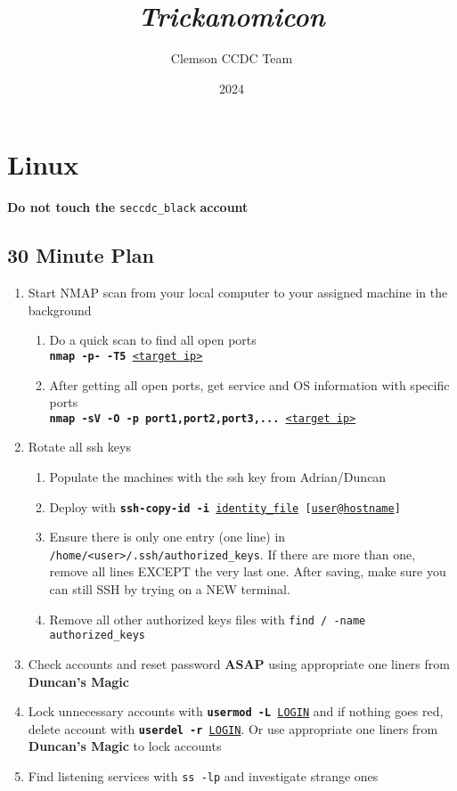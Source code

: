 \documentclass[12pt,letterpaper]{article}
\title{\huge{\textit{Trickanomicon}}}
\author{Clemson CCDC Team}
\date{2024}
\def\code#1{\textcolor{c2}{\texttt{#1}}}
\def\bf#1{\textbf{#1}}
\def\ul#1{\underline{#1}}
\begin{document}
\maketitle

\pagebreak

\tableofcontents

\pagebreak

\section{Linux}

\bf{Do not touch the} \code{seccdc\_black} \bf{account}

\subsection{30 Minute Plan}

\begin{enumerate}
	\item Start NMAP scan from your local computer to your assigned machine in the background
		\begin{enumerate}
			\item Do a quick scan to find all open ports \\
				\code{\bf{nmap -p- -T5} \ul{<target ip>}}
			\item After getting all open ports, get service and OS information with specific ports \\
				\code{\bf{nmap -sV -O -p port1,port2,port3,...} \ul{<target ip>}}
		\end{enumerate}
	\item Rotate all ssh keys
		\begin{enumerate}
			\item Populate the machines with the ssh key from Adrian/Duncan
			\item Deploy with \code{\bf{ssh-copy-id -i} \ul{identity\_file} [\ul{user}@\ul{hostname}]}
			\item Ensure there is only one entry (one line) in \code{/home/<user>/.ssh/authorized\_keys}. If there are more than one, remove all lines EXCEPT the very last one. After saving, make sure you can still SSH by trying on a NEW terminal.
			\item Remove all other authorized keys files with \code{find / -name authorized\_keys}
		\end{enumerate}
	\item Check accounts and reset password \bf{ASAP} using appropriate one liners from \bf{Duncan's Magic}
	\item Lock unnecessary accounts with \code{\bf{usermod -L} \ul{LOGIN}} and if nothing goes red, delete account with \code{\bf{userdel -r} \ul{LOGIN}}. Or use appropriate one liners from \bf{Duncan's Magic} to lock accounts
	\item Find listening services with \code{ss -lp} and investigate strange ones
\end{enumerate}
\end{document}
